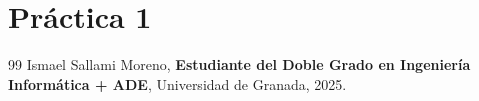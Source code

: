 \documentclass[a4paper,12pt]{book}
\begin{document}
\chapter{Práctica 1}






\newpage
\begin{thebibliography}{99}
Ismael Sallami Moreno, \textbf{Estudiante del Doble Grado en Ingeniería Informática + ADE}, Universidad de Granada, 2025.

\end{thebibliography}
\end{document}
